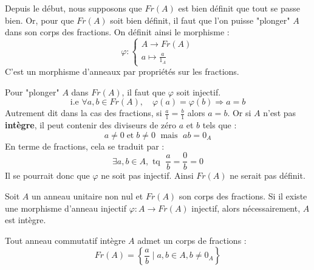 \begin{proposition}
    Depuis le début, nous supposons que $Fr(A)$ est bien définit que tout se passe bien. Or, pour que $Fr(A)$ 
    soit bien définit, il faut que l'on puisse "plonger" $A$ dans son corps des fractions. 
    On définit ainsi le morphisme : 
        \[ \varphi : 
            \begin{cases}
                A \longrightarrow Fr(A) \\ 
                a \longmapsto \frac{a}{1_A}
            \end{cases} \] 
    C'est un morphisme d'anneaux par propriétés sur les fractions. 
    
    Pour "plonger" $A$ dans $Fr(A)$, il faut que $\varphi$ soit injectif. 
            \[ \text{i.e } \forall a,b \in Fr(A), \quad \varphi(a) = \varphi(b) \Longrightarrow a = b \] 
    Autrement dit dans la cas des fractions, si $\frac{a}{1} = \frac{b}{1}$ alors $a = b$. 
    Or si $A$ n'est pas \textbf{intègre}, il peut contenir des diviseurs de zéro $a$ et $b$ tels que : 
            \[ a \not  = 0 \; \text{et} \; b \not  = 0 \; \text{ mais } \; ab = 0_A \] 
    En terme de fractions, cela se traduit par : 
        \[ \exists a,b \in A, \text{ tq } \; \frac{a}{b} = \frac{0}{b} = 0 \] 
    Il se pourrait donc que $\varphi$ ne soit pas injectif. Ainsi $Fr(A)$ ne serait pas définit. 
\end{proposition}

\begin{prop}
    Soit $A$ un anneau unitaire non nul et $Fr(A)$ son corps des fractions. 
    Si il existe une morphisme d'anneau injectif $ \varphi : A \longrightarrow Fr(A)$ injectif, 
    alors nécessairement, $A$ est intègre. 
\end{prop}

\begin{theorem}
    Tout anneau commutatif intègre $A$ admet un corps de fractions : 
        \[ Fr(A) = \left\{ \frac{a}{b} \; | \; a,b \in A, b \not  = 0_A \right\} \] 
\end{theorem}

